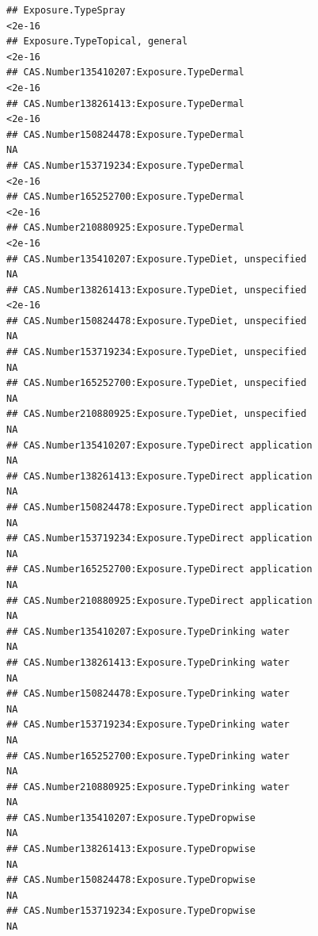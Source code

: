 \documentclass[
  12pt,
]{article}
\begin{document}
\begin{verbatim}
## Exposure.TypeSpray                                                            <2e-16
## Exposure.TypeTopical, general                                                 <2e-16
## CAS.Number135410207:Exposure.TypeDermal                                       <2e-16
## CAS.Number138261413:Exposure.TypeDermal                                       <2e-16
## CAS.Number150824478:Exposure.TypeDermal                                           NA
## CAS.Number153719234:Exposure.TypeDermal                                       <2e-16
## CAS.Number165252700:Exposure.TypeDermal                                       <2e-16
## CAS.Number210880925:Exposure.TypeDermal                                       <2e-16
## CAS.Number135410207:Exposure.TypeDiet, unspecified                                NA
## CAS.Number138261413:Exposure.TypeDiet, unspecified                            <2e-16
## CAS.Number150824478:Exposure.TypeDiet, unspecified                                NA
## CAS.Number153719234:Exposure.TypeDiet, unspecified                                NA
## CAS.Number165252700:Exposure.TypeDiet, unspecified                                NA
## CAS.Number210880925:Exposure.TypeDiet, unspecified                                NA
## CAS.Number135410207:Exposure.TypeDirect application                               NA
## CAS.Number138261413:Exposure.TypeDirect application                               NA
## CAS.Number150824478:Exposure.TypeDirect application                               NA
## CAS.Number153719234:Exposure.TypeDirect application                               NA
## CAS.Number165252700:Exposure.TypeDirect application                               NA
## CAS.Number210880925:Exposure.TypeDirect application                               NA
## CAS.Number135410207:Exposure.TypeDrinking water                                   NA
## CAS.Number138261413:Exposure.TypeDrinking water                                   NA
## CAS.Number150824478:Exposure.TypeDrinking water                                   NA
## CAS.Number153719234:Exposure.TypeDrinking water                                   NA
## CAS.Number165252700:Exposure.TypeDrinking water                                   NA
## CAS.Number210880925:Exposure.TypeDrinking water                                   NA
## CAS.Number135410207:Exposure.TypeDropwise                                         NA
## CAS.Number138261413:Exposure.TypeDropwise                                         NA
## CAS.Number150824478:Exposure.TypeDropwise                                         NA
## CAS.Number153719234:Exposure.TypeDropwise                                         NA

\end{verbatim}
\end{document}
